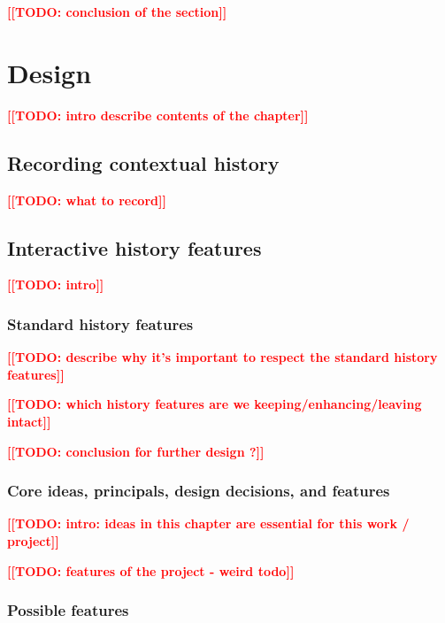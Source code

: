 \documentclass[thesis=M,english]{FITthesis}[2012/10/20]
\newcommand{\todotext}[1]{\textcolor{red}{\textbf{[[#1]]}}}
\newcommand{\blind}[1][1]{\textcolor{mygray}{\Blindtext[#1][1]}}
\begin{document}
\blind[2]

\todotext{TODO: conclusion of the section}



\chapter{Design}
\todotext{TODO: intro describe contents of the chapter}

\blind
{}
\section{Recording contextual history}

\todotext{TODO: what to record}

\blind[2]

\section{Interactive history features} %

\todotext{TODO: intro}

\blind

\subsection{Standard history features}

\todotext{TODO: describe why it's important to respect the standard history features}

\todotext{TODO: which history features are we keeping/enhancing/leaving intact}

\blind[3]

\todotext{TODO: conclusion for further design ?}



\subsection{Core ideas, principals, design decisions, and features}

\todotext{TODO: intro: ideas in this chapter are essential for this work / project}

\todotext{TODO: features of the project - weird todo}

\blind[3]

\subsection{Possible features}
\end{document}

